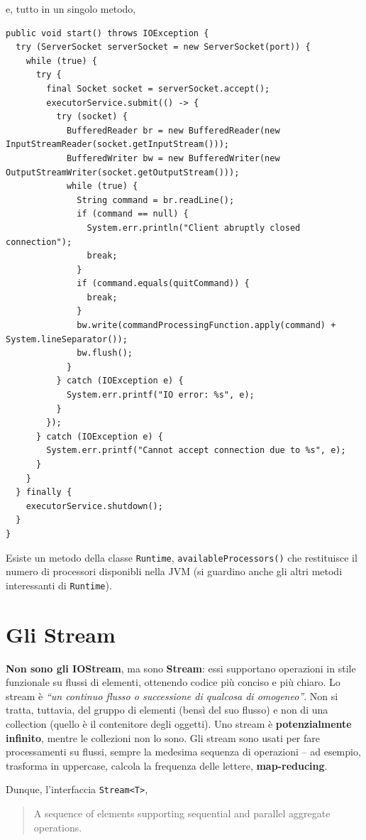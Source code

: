 \documentclass[\fontsizeclass,twocolumn]{\classname}
\theoremstyle{definition}
\theoremstyle{definition}
\begin{document}
e, tutto in un singolo metodo,

\begin{lstlisting}
public void start() throws IOException {
  try (ServerSocket serverSocket = new ServerSocket(port)) {
    while (true) {
      try {
        final Socket socket = serverSocket.accept();
        executorService.submit(() -> {
          try (socket) {
            BufferedReader br = new BufferedReader(new InputStreamReader(socket.getInputStream()));
            BufferedWriter bw = new BufferedWriter(new OutputStreamWriter(socket.getOutputStream()));
            while (true) {
              String command = br.readLine();
              if (command == null) {
                System.err.println("Client abruptly closed connection");
                break;
              }
              if (command.equals(quitCommand)) {
                break;
              }
              bw.write(commandProcessingFunction.apply(command) + System.lineSeparator());
              bw.flush();
            }
          } catch (IOException e) {
            System.err.printf("IO error: %s", e);
          }
        });
      } catch (IOException e) {
        System.err.printf("Cannot accept connection due to %s", e);
      }
    }
  } finally {
    executorService.shutdown();
  }
}
\end{lstlisting}


Esiste un metodo della classe \texttt{Runtime}, \texttt{availableProcessors()}
che restituisce il numero di processori disponibli nella JVM (si guardino anche
gli altri metodi interessanti di \texttt{Runtime}).

\chapter{Gli Stream}

\textbf{Non sono gli IOStream}, ma sono \textbf{Stream}: essi supportano
operazioni in stile funzionale su flussi di elementi, ottenendo codice più
conciso e più chiaro. Lo stream è \emph{``un continuo flusso o successione di
qualcosa di omogeneo''}. Non si tratta, tuttavia, del gruppo di elementi (bensì
del suo flusso) e non di una collection (quello è il contenitore degli
oggetti). Uno stream è \textbf{potenzialmente infinito}, mentre le collezioni
non lo sono. Gli stream sono usati per fare processamenti su flussi, sempre la
medesima sequenza di operazioni -- ad esempio, trasforma in uppercase, calcola
la frequenza delle lettere, \textbf{map\--reducing}.

Dunque, l'interfaccia \texttt{Stream<T>},
\begin{quote}
    \footnotesize{A sequence of elements supporting sequential and parallel aggregate operations.

}
\end{quote}
\end{document}
